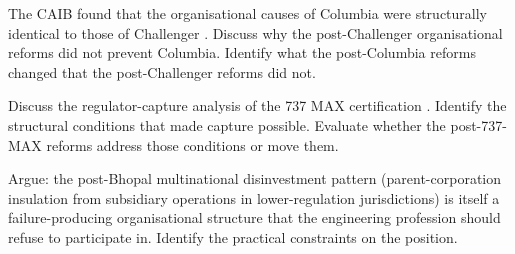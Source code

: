 \begin{exercise}
The CAIB found that the organisational causes of Columbia were structurally identical to those of Challenger \cite{acc:caib-columbia}. Discuss why the post-Challenger organisational reforms did not prevent Columbia. Identify what the post-Columbia reforms changed that the post-Challenger reforms did not.
\end{exercise}

\begin{exercise}
Discuss the regulator-capture analysis of the 737 MAX certification \cite{acc:house-737max-2020}. Identify the structural conditions that made capture possible. Evaluate whether the post-737-MAX reforms address those conditions or move them.
\end{exercise}

\begin{exercise}
Argue: the post-Bhopal multinational disinvestment pattern (parent-corporation insulation from subsidiary operations in lower-regulation jurisdictions) is itself a failure-producing organisational structure that the engineering profession should refuse to participate in. Identify the practical constraints on the position.
\end{exercise}
